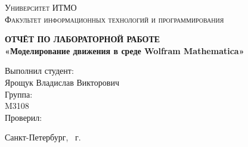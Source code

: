 \begin{titlepage}
\begin{center}
\textsc{
Университет ИТМО\\[3mm]
Факультет информационных технологий и программирования}

\vfill

\textbf{
ОТЧЁТ ПО ЛАБОРАТОРНОЙ РАБОТЕ\\[3mm]
«Моделирование движения в среде Wolfram Mathematica»\\[20mm]}
\end{center}

\hfill
\begin{minipage}{.5\textwidth}
Выполнил студент:\\[2mm] 
Ярощук Владислав Викторович\\[4mm]
Группа:\\[2mm]
M3108\\[5mm]

Проверил:\\[7mm] 
\end{minipage}%
\vfill
\begin{center}
Санкт-Петербург, \theyear\ г.
\end{center}
\end{titlepage}
